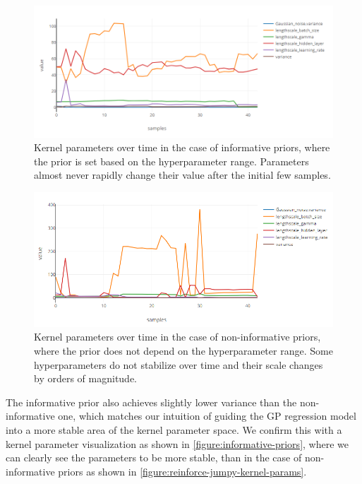 \begin{figure}
	\begin{center}
		\includegraphics[width=1.0\textwidth]{images/informative-priors.png}
		\caption{Kernel parameters over time in the case of informative priors, where the prior is set based on the hyperparameter range. Parameters almost never rapidly change their value after the initial few samples.}
		\label{figure:informative-priors}
	\end{center}
\end{figure}

\begin{figure}
	\begin{center}
		\includegraphics[width=1.0\textwidth]{images/reinforce-jumpy-kernel-params.png}
		\caption{Kernel parameters over time in the case of non-informative priors, where the prior does not depend on the hyperparameter range. Some hyperparameters do not stabilize over time and their scale changes by orders of magnitude.}
		\label{figure:reinforce-jumpy-kernel-params}
	\end{center}
\end{figure}


The informative prior also achieves slightly lower variance than the non-informative one, which matches our intuition of guiding the GP regression model into a more stable area of the kernel parameter space. We confirm this with a kernel parameter visualization as shown in \autoref{figure:informative-priors}, where we can clearly see the parameters to be more stable, than in the case of non-informative priors as shown in \autoref{figure:reinforce-jumpy-kernel-params}.

